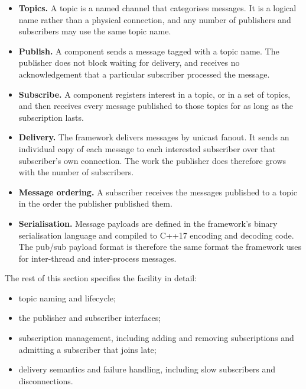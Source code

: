\begin{itemize}
\item \textbf{Topics.} A topic is a named channel that categorises messages. It
  is a logical name rather than a physical connection, and any number of
  publishers and subscribers may use the same topic name.

\item \textbf{Publish.} A component sends a message tagged with a topic name.
  The publisher does not block waiting for delivery, and receives no
  acknowledgement that a particular subscriber processed the message.

\item \textbf{Subscribe.} A component registers interest in a topic, or in a set
  of topics, and then receives every message published to those topics for as
  long as the subscription lasts.

\item \textbf{Delivery.} The framework delivers messages by unicast fanout. It
  sends an individual copy of each message to each interested subscriber over
  that subscriber's own connection. The work the publisher does therefore grows
  with the number of subscribers.

\item \textbf{Message ordering.} A subscriber receives the messages published to
  a topic in the order the publisher published them.

\item \textbf{Serialisation.} Message payloads are defined in the framework's
  binary serialisation language and compiled to C++17 encoding and decoding
  code. The pub/sub payload format is therefore the same format the framework
  uses for inter-thread and inter-process messages.
\end{itemize}

The rest of this section specifies the facility in detail:

\begin{itemize}
\item topic naming and lifecycle;
\item the publisher and subscriber interfaces;
\item subscription management, including adding and removing subscriptions and
  admitting a subscriber that joins late;
\item delivery semantics and failure handling, including slow subscribers and
  disconnections.
\end{itemize}

